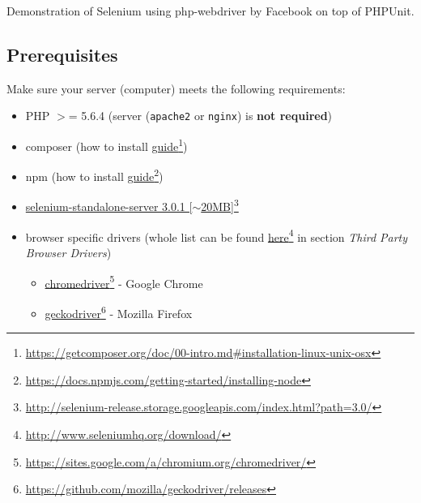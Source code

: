 Demonstration of Selenium using php-webdriver by Facebook on top of PHPUnit.
\subsection{Prerequisites}
\label{prerequisites}

Make sure your server (computer) meets the following requirements:

\begin{itemize}
\item PHP $>$= 5.6.4 (server (\texttt{apache2} or \texttt{nginx}) is \textbf{not required})

\item composer (how to install \href{https://getcomposer.org/doc/00-intro.md#installation-linux-unix-osx}{guide}\footnote{\href{https://getcomposer.org/doc/00-intro.md\#installation-linux-unix-osx}{https:/\slash getcomposer.org\slash doc\slash 00-intro.md\#installation-linux-unix-osx}})

\item npm (how to install \href{https://docs.npmjs.com/getting-started/installing-node}{guide}\footnote{\href{https://docs.npmjs.com/getting-started/installing-node}{https:/\slash docs.npmjs.com\slash getting-started\slash installing-node}})

\item \href{http://selenium-release.storage.googleapis.com/index.html?path=3.0/}{selenium-standalone-server 3.0.1 [\ensuremath{\sim}20MB]}\footnote{\href{http://selenium-release.storage.googleapis.com/index.html?path=3.0/}{http:/\slash selenium-release.storage.googleapis.com\slash index.html?path=3.0\slash }}

\item browser specific drivers (whole list can be found \href{http://www.seleniumhq.org/download/}{here}\footnote{\href{http://www.seleniumhq.org/download/}{http:/\slash www.seleniumhq.org\slash download\slash }} in section \emph{Third Party Browser Drivers})

\begin{itemize}
\item \href{https://sites.google.com/a/chromium.org/chromedriver/}{chromedriver}\footnote{\href{https://sites.google.com/a/chromium.org/chromedriver/}{https:/\slash sites.google.com\slash a\slash chromium.org\slash chromedriver\slash }} - Google Chrome

\item \href{https://github.com/mozilla/geckodriver/releases}{geckodriver}\footnote{\href{https://github.com/mozilla/geckodriver/releases}{https:/\slash github.com\slash mozilla\slash geckodriver\slash releases}} - Mozilla Firefox


\end{itemize}
\end{itemize}

